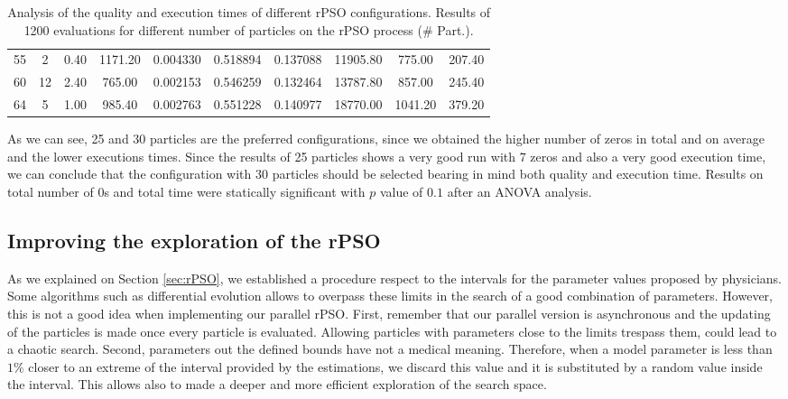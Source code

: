 \begin{table}[h]
\begin{tabular}{cccccccccc}
		\cellcolor[HTML]{C0C0C0}55          & 2             & {\color[HTML]{FE0000} 0.40} & {\color[HTML]{FE0000} 1171.20} & 0.004330                        & 0.518894                        & 0.137088                        & 11905.80                        & 775.00                         & 207.40                        \\
		\cellcolor[HTML]{C0C0C0}60          & 12            & 2.40                        & 765.00                         & 0.002153                        & 0.546259                        & 0.132464                        & 13787.80                        & 857.00                         & 245.40                        \\
		\cellcolor[HTML]{C0C0C0}64          & 5             & 1.00                        & 985.40                         & 0.002763                        & 0.551228                        & 0.140977                        & {\color[HTML]{FE0000} 18770.00} & {\color[HTML]{FE0000} 1041.20} & {\color[HTML]{FE0000} 379.20} \\ \hline
	\end{tabular}
	\caption{Analysis of the quality and execution times of different rPSO configurations. Results of 1200 evaluations for different number of particles on the rPSO process (\# Part.).}
	\label{tab.color}
\end{table}

As we can see, 25 and 30 particles are the preferred configurations, since we obtained the higher number of zeros in total and on average and the lower executions times. Since the results of 25 particles shows a very good run with 7 zeros and also a very good execution time, we can conclude that the configuration with 30 particles should be selected bearing in mind both quality and execution time. Results on total number of 0s and total time were statically significant with $p$ value of $0.1$ after an ANOVA analysis.

\subsection{Improving the exploration of the rPSO}
As we explained on Section \ref{sec:rPSO}, we established a procedure respect to the intervals for the parameter values proposed by physicians. Some algorithms such as differential evolution \cite{storn1997differential} allows to overpass these limits in the search of a good combination of parameters. However, this is not a good idea when implementing our parallel rPSO. First, remember that our parallel version is asynchronous and the updating of the particles is made once every particle is evaluated. Allowing particles with parameters close to the limits trespass them, could lead to a chaotic search. Second, parameters out the defined bounds have not a medical meaning. Therefore, when a model parameter is less than $1\%$ closer to an extreme of the interval provided by the  estimations, we discard this value and it is substituted by a random value inside the interval. This allows also to made a deeper and more efficient exploration of the search space.


